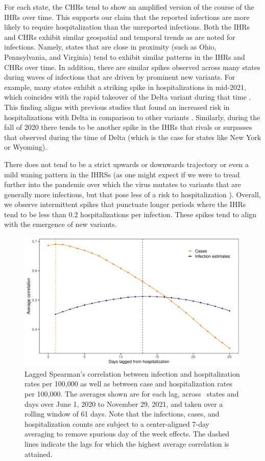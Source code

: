 \documentclass{article}
\begin{document}
For each state, the CHRs tend to show an amplified version of the course of the IHRs over time.
This supports our claim that the reported infections are more likely to require hospitalization
than the unreported infections. Both the IHRs and CHRs exhibit similar geospatial and 
temporal trends as are noted for infections. 
Namely, states that are close in proximity (such as Ohio, Pennsylvania, and Virginia) tend to 
exhibit similar patterns in the IHRs and CHRs over time. In addition, 
there are similar spikes observed across many states during 
waves of infections that are driven by prominent new variants. For example, many
states exhibit a striking spike in hospitalizations in mid-2021, which coincides with the rapid takeover 
of the Delta variant during that time \citep{hodcroft2021covariants}. This finding aligns with 
previous studies that found an increased risk in hospitalizations with Delta in comparison to other
variants \citep{twohig2022hospital, nyberg2022comparative}. Similarly, during the fall of 2020 
there tends to be another spike in the IHRs
that rivals or surpasses that observed during the time of Delta (which is the case for states
 like New York or Wyoming). 

There does not tend to be a strict upwards or downwards trajectory or even a mild waning pattern
 in the IHRSs (as one might expect if we were to tread further into the pandemic over
  which the virus mutates to variants that are generally more infectious, but that
   pose less of a risk to hospitalization \citep{lorenzo2022covid, blauer2022compare}). 
Overall, we observe intermittent spikes that punctuate longer periods where the IHRs 
tend to be less than $0.2$ hospitalizations per infection. 
These spikes tend to align with the emergence of new variants.  %

\clearpage
\begin{figure}[!tb]
\centering
    \includegraphics[width=.8\textwidth]{infect_case_hosp_lag_corr_F24.pdf} 
    \caption{Lagged Spearman's correlation between infection and hospitalization
    rates per 100,000 as well as between case and hospitalization rates per
    100,000. The averages shown are for each lag, across \US\ states and days
    over June 1, 2020 to November 29, 2021, and taken over a rolling window of
    61 days. Note that the infections, cases, and hospitalization counts are
    subject to a center-aligned 7-day averaging to remove spurious day of the
    week effects. The dashed lines indicate the lags for which the highest
    average correlation is attained.}
    \label{fig:infect_case_hosp_lag_corr}
\end{figure}
\end{document}
